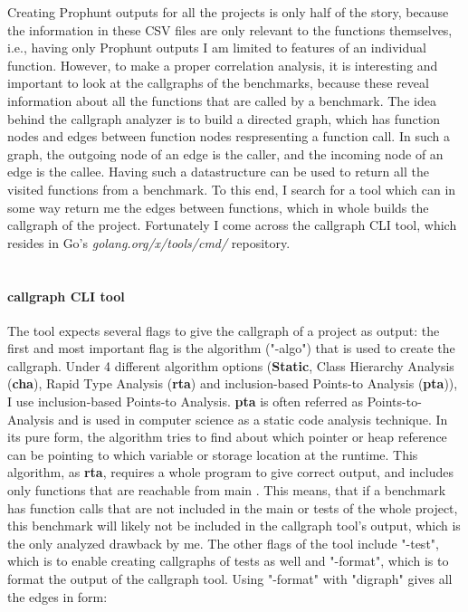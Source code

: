 \documentclass{seal_thesis}
\begin{document}
Creating Prophunt outputs for all the projects is only half of the story, because the information in these CSV files are only relevant to the functions themselves, i.e., having only Prophunt outputs I am limited to features of an individual function. However, to make a proper correlation analysis, it is interesting and important to look at the callgraphs of the benchmarks, because these reveal information about all the functions that are called by a benchmark. The idea behind the callgraph analyzer is to build a directed graph, which has function nodes and edges between function nodes respresenting a function call. In such a graph, the outgoing node of an edge is the caller, and the incoming node of an edge is the callee. Having such a datastructure can be used to return all the visited functions from a benchmark. To this end, I search for a tool which can in some way return me the edges between functions, which in whole builds the callgraph of the project. Fortunately I come across the callgraph CLI tool, which resides in Go's \textit{golang.org/x/tools/cmd/} repository\cite{callgraphtool}.\\
\\
\paragraph{callgraph CLI tool} The tool expects several flags to give the callgraph of a project as output: the first and most important flag is the algorithm ("-algo") that is used to create the callgraph. Under 4 different algorithm options (\textbf{Static}, Class Hierarchy Analysis (\textbf{cha}), Rapid Type Analysis (\textbf{rta}) and inclusion-based Points-to Analysis (\textbf{pta})), I use inclusion-based Points-to Analysis. \textbf{pta} is often referred as Points-to-Analysis and is used in computer science as a static code analysis technique. In its pure form, the algorithm tries to find about which pointer or heap reference can be pointing to which variable or storage location at the runtime. This algorithm, as \textbf{rta}, requires a whole program to give correct output, and includes only functions that are reachable from main \cite{callgraphtool}. This means, that if a benchmark has function calls that are not included in the main or tests of the whole project, this benchmark will likely not be included in the callgraph tool's output, which is the only analyzed drawback by me. The other flags of the tool include "-test", which is to enable creating callgraphs of tests as well and "-format", which is to format the output of the callgraph tool. Using "-format" with "digraph" gives all the edges in form:
\end{document}
